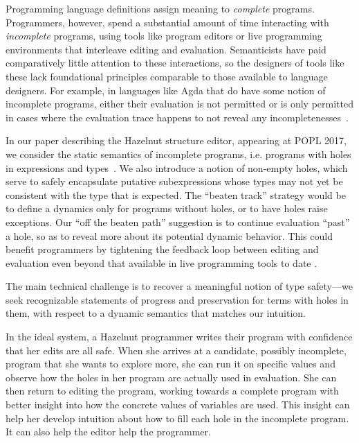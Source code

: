 Programming language definitions assign meaning to \textit{complete}
programs. Programmers, however, spend a substantial amount of time
interacting with \textit{incomplete} programs, using tools like program
editors or live programming environments that interleave editing and
evaluation. Semanticists have paid comparatively little attention to these
interactions, so the designers of tools like these lack foundational
principles comparable to those available to language designers. For
example, in languages like Agda that do have some notion of incomplete
programs, either their evaluation is not permitted or is only permitted in
cases where the evaluation trace happens to not reveal any
incompletenesses~\cite{norell:thesis}.

In our paper describing the Hazelnut structure editor, appearing at POPL 2017, we consider the static semantics of incomplete
programs, i.e. programs with holes in expressions and types~\cite{hazelnut:popl}. We also introduce a notion of non-empty holes, which serve to safely encapsulate putative
subexpressions whose types may not yet be consistent with the type that is expected. The ``beaten track'' strategy would be to define a dynamics only for programs without holes, or to have holes raise exceptions. Our ``off the beaten path'' suggestion is to continue evaluation ``past'' a hole, so as to reveal more about its potential dynamic behavior. This could benefit programmers by tightening the feedback loop between editing and evaluation even beyond that available in live programming tools to date \cite{burckhardt2013s}.

The main technical challenge is to recover a meaningful notion of type safety---we
seek recognizable statements of progress and preservation for terms with
holes in them, with respect to a dynamic semantics that matches our
intuition.


In the ideal system, a Hazelnut programmer writes their program with
confidence that her edits are all safe. When she arrives at a candidate,
possibly incomplete, program that she wants to explore more, she can run it
on specific values and observe how the holes in her program are actually
used in evaluation. She can then return to editing the program, working
towards a complete program with better insight into how the concrete values
of variables are used. This insight can help her develop intuition about
how to fill each hole in the incomplete program. It can also help the editor help the programmer.